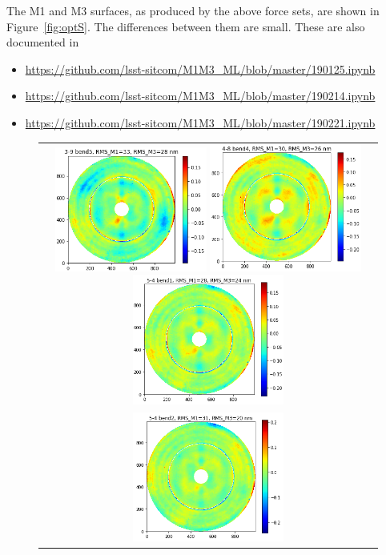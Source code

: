 \documentclass [twoside,openbib,12pt]{article}
\newcommand{\bitm}{\begin{itemize}}
\newcommand{\eitm}{\end{itemize}}
\begin{document}
  The M1 and M3 surfaces, as produced by the above force sets, are
  shown in Figure~\ref{fig:optS}. The differences between them are small.
  These are also documented in
  \bitm
\item \url{https://github.com/lsst-sitcom/M1M3_ML/blob/master/190125.ipynb}
\item \url{https://github.com/lsst-sitcom/M1M3_ML/blob/master/190214.ipynb}
\item \url{https://github.com/lsst-sitcom/M1M3_ML/blob/master/190221.ipynb}
  \eitm

 \begin{figure}[bthp]
   \begin{center}
     \begin{tabular}{c}
\includegraphics[width=50mm]{figures/optS1.png}
\includegraphics[width=50mm]{figures/optS3.png}
\includegraphics[width=50mm]{figures/optSa.png} \\
\includegraphics[width=50mm]{figures/optSb.png}

\end{tabular}
\end{center}
\end{figure}
\end{document}
